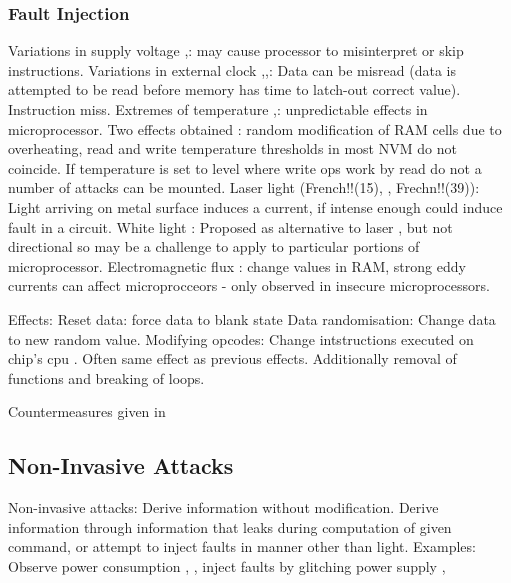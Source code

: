 \subsubsection{Fault Injection}
Variations in supply voltage \cite{Anderson1996},\cite{Blomer2010}: may cause processor to misinterpret or skip instructions.
Variations in external clock \cite{Anderson1996},\cite{Street},\cite{Kommerling1999}: Data can be misread (data is attempted to be read before memory has time to latch-out correct value). Instruction miss.
Extremes of temperature \cite{Boneh},\cite{Govindavajhala2003}: unpredictable effects in microprocessor. Two effects obtained \cite{Bar-el2006}: random modification of RAM cells due to overheating, read and write temperature thresholds in most NVM do not coincide. If temperature is set to level where write ops work by read do not a number of attacks can be mounted.
Laser light (French!!(15), \cite{Habing1965}, Frechn!!(39)): Light arriving on metal surface induces a current, if intense enough could induce fault in a circuit.
White light \cite{Anderson1996}: Proposed as alternative to laser \cite{Skorobogatov2007}, but not directional so may be a challenge to apply to particular portions of microprocessor.
Electromagnetic flux \cite{Samyde2003}: change values in RAM, strong eddy currents can affect microprocceors - only observed in insecure microprocessors.

Effects:
Reset data: force data to blank state
Data randomisation: Change data to new random value.
Modifying opcodes: Change intstructions executed on chip's cpu \cite{Anderson1996}. Often same effect as previous effects. Additionally removal of functions and breaking of loops. 

Countermeasures given in \cite{Bar-el2006}
  
\subsection{Non-Invasive Attacks}
Non-invasive attacks: Derive information without modification.
Derive information through information that leaks during computation of given command, or attempt to inject faults in manner other than light.
Examples: Observe power consumption \cite{Maurer1999}, \cite{MangardStefan2007Paa:}, inject faults by glitching power supply \cite{Anderson1996}, \cite{Bar-el2006}